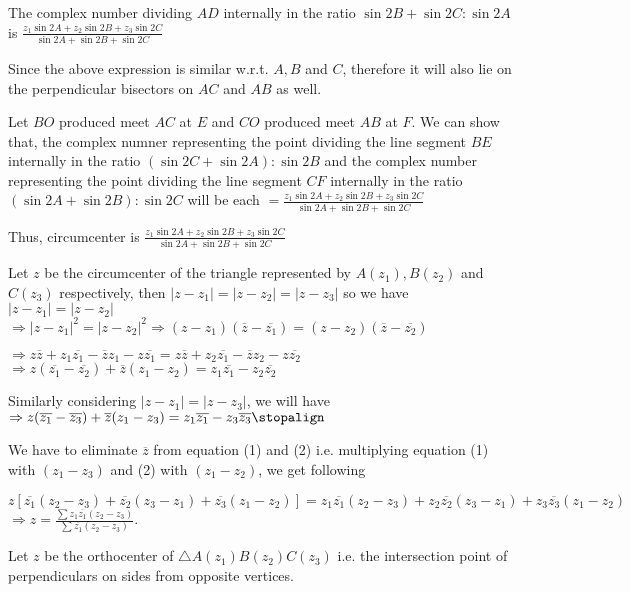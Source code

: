   The complex number dividing $AD$ internally in the ratio $\sin2B+\sin2C:\sin2A$ is $\frac{z_1\sin 2A +
    z_2\sin 2B + z_3\sin 2C}{\sin 2A + \sin 2B + \sin 2C}$

  Since the above expression is similar w.r.t. $A, B$ and $C$, therefore it will also lie on the
  perpendicular bisectors on $AC$ and $AB$ as well.

  Let $BO$ produced meet $AC$ at $E$ and $CO$ produced meet $AB$ at $F$. We can show that, the complex
  numner representing the point dividing the line segment $BE$ internally in the ratio $(\sin2C +
  \sin2A):\sin2B$ and the complex number representing the point dividing the line segment $CF$ internally in
  the ratio $(\sin2A+ \sin2B):\sin2C$ will be each $= \frac{z_1\sin 2A + z_2\sin 2B + z_3\sin 2C}{\sin 2A +
    \sin 2B + \sin 2C}$

  Thus, circumcenter is $\frac{z_1\sin 2A + z_2\sin 2B + z_3\sin 2C}{\sin 2A + \sin 2B + \sin 2C}$
\item Let $z$ be the circumcenter of the triangle represented by $A(z_1), B(z_2)$ and $C(z_3)$ respectively,
  then $|z - z_1| = |z - z_2| = |z - z_3|$ so we have $|z - z_1| = |z - z_2|$
  $\Rightarrow |z - z_1|^2 = |z - z_2|^2 \Rightarrow (z - z_1)(\overline{z} - \overline{z_1}) = (z -
  z_2)(\overline{z} - \overline{z_2})$

  $\Rightarrow z\overline{z} + z_1\overline{z_1} - \overline{z}z_1 - z\overline{z_1} = z\overline{z} +
  z_2\overline{z_1} - \overline{z}z_2 - z\overline{z_2}$
  $\Rightarrow z(\overline{z_1} - \overline{z_2})+ \overline{z}(z_1 - z_2) = z_1\overline{z_1} - z_2\overline{z_2}$

  Similarly considering $|z - z_1| = |z - z_3|$, we will have
  $\Rightarrow z(\overline{z_1} - \overline{z_3})+ \overline{z}(z_1 - z_3) = z_1\overline{z_1} - z_3\overline{z_3}\stopalign$

  We have to eliminate $\overline{z}$ from equation (1) and (2) i.e. multiplying equation (1) with $(z_1 - z_3)$ and (2) with $(z_1
  - z_2)$, we get following

  $z[\overline{z_1}(z_2 - z_3) + \overline{z_2}(z_3 - z_1) + \overline{z_3}(z_1 - z_2)] = z_1\overline{z_1}(z_2 - z_3) +
  z_2\overline{z_2}(z_3 - z_1) + z_3\overline{z_3}(z_1 - z_2)$
  $\Rightarrow z = \frac{\sum z_1\overline{z_1}(z_2 - z_3)}{\sum \overline{z_1}(z_2 - z_3)}$.
\item Let $z$ be the orthocenter of $\triangle A(z_1)B(z_2)C(z_3)$ i.e. the intersection point of
  perpendiculars on sides from opposite vertices.

